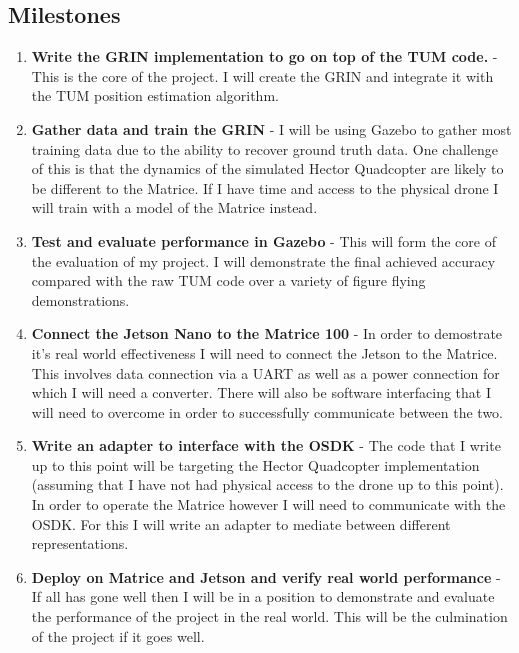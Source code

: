 \documentclass[]{../resources/final_report}
\begin{document}
\subsection{Milestones}
\begin{enumerate}
  \item \textbf{Write the GRIN implementation to go on top of the TUM code.} - This is the core of the project. I will create the GRIN and integrate it with the TUM position estimation algorithm.
  \item \textbf{Gather data and train the GRIN} - I will be using Gazebo to gather most training data due to the ability to recover ground truth data. One challenge of this is that the dynamics of the simulated Hector Quadcopter are likely to be different to the Matrice. If I have time and access to the physical drone I will train with a model of the Matrice instead.
  \item \textbf{Test and evaluate performance in Gazebo} - This will form the core of the evaluation of my project. I will demonstrate the final achieved accuracy compared with the raw TUM code over a variety of figure flying demonstrations.
  \item \textbf{Connect the Jetson Nano to the Matrice 100} - In order to demostrate it's real world effectiveness I will need to connect the Jetson to the Matrice. This involves data connection via a UART as well as a power connection for which I will need a converter. There will also be software interfacing that I will need to overcome in order to successfully communicate between the two.
  \item \textbf{Write an adapter to interface with the OSDK} - The code that I write up to this point will be targeting the Hector Quadcopter implementation (assuming that I have not had physical access to the drone up to this point). In order to operate the Matrice however I will need to communicate with the OSDK. For this I will write an adapter to mediate between different representations.
  \item \textbf{Deploy on Matrice and Jetson and verify real world performance} - If all has gone well then I will be in a position to demonstrate and evaluate the performance of the project in the real world. This will be the culmination of the project if it goes well.
\end{enumerate}
\end{document}
